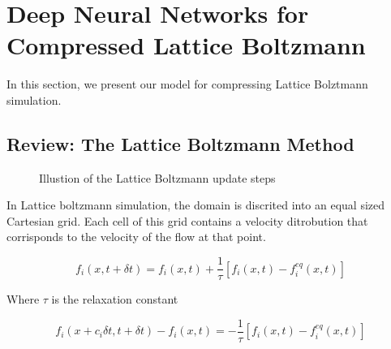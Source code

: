 \documentclass{article}
\begin{document}


\section{Deep Neural Networks for Compressed Lattice Boltzmann}

In this section, we present our model for compressing Lattice Bolztmann simulation.

\subsection{Review: The Lattice Boltzmann Method}

\begin{figure}[!t]
\centering
{}
\caption{Illustion of the Lattice Boltzmann update steps}
\label{lattice_boltzmann}
\end{figure}

In Lattice boltzmann simulation, the domain is discrited into an equal sized Cartesian grid. Each cell of this grid contains a velocity ditrobution that corrisponds to the velocity of the flow at that point. 

\begin{equation}
  f_i(x, t+ \delta{t}) = f_i(x,t) + \frac{1}{\tau} [f_i(x,t) - f_i^{eq}(x,t)]
\end{equation}

Where $\tau$ is the relaxation constant

\begin{equation}
  f_i(x+c_i \delta{t}, t+ \delta{t}) - f_i(x,t) = -\frac{1}{\tau} [f_i(x,t) - f_i^{eq}(x,t)]
\end{equation}
\end{document}
